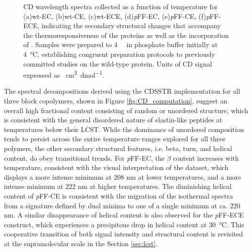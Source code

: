 \begin{refsection}
\begin{figure}[h!]
{CD wavelength spectra collected as a function of temperature for (a)wt-EC,
    (b)wt-CE, (c)wt-ECE, (d)\emph{p}FF-EC, (e)\emph{p}FF-CE, (f)\emph{p}FF-ECE,
    indicating the secondary structural changes that accompany the
    thermoresponsiveness of the proteins as well as the incorporation of
    .  Samples were prepared to
    \SI{4}{\micro\moLar} in phosphate buffer initially at \SI{4}{\celsius},
    establishing congruent preparation protocols to previously committed studies
    on the wild-type protein.\cite{Haghpanah2009} Units of CD signal expressed
    as \si{\degtext\cm\squared\per\deci\mol}.}
    
    \label{fig:CD_temp_wl}
\end{figure}

The spectral decompositions derived using the CDSSTR implementation for all
three block copolymers, shown in Figure \ref{fig:CD_computation}, suggest an
overall high fractional content consisting of random or unordered structure,
which is consistent with the general disordered nature of elastin-like peptides
at temperatures below their LCST.  While the dominance of unordered composition
tends to persist across the entire temperature ranges explored for all three
polymers, the other secondary structural features, i.e. beta, turn, and helical
content, do obey transitional trends. For \emph{p}FF-EC, the ${\beta}$ content
increases with temperature, consistent with the visual interpretation of the
dataset, which displays a more intense minimum at 208 nm at lower temperatures,
and a more intense minimum at 222 nm at higher temperatures. The diminishing
helical content of \emph{p}FF-CE is consistent with the migration of the
isothermal spectra from a signature defined by dual minima to one of a single
minimum at ca. 220 nm. A similar disappearance of helical content is also
observed for the \emph{p}FF-ECE construct, which experiences a precipitous drop
in helical content at \SI{30}{\celsius}. This cooperative transition of both
signal intensity and structural content is revisited at the supramolecular scale
in the Section \ref{sec:lcst}.


\end{refsection}
